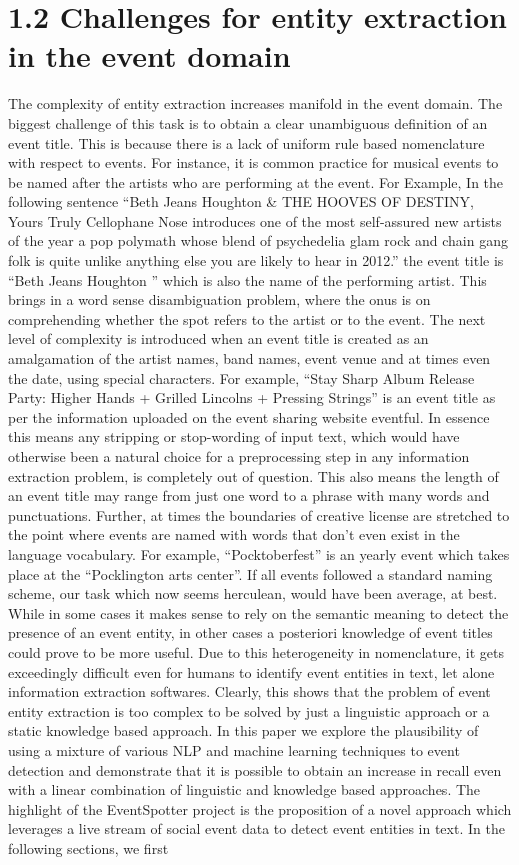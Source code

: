 \documentclass[a4paper,11pt]{report}
\begin{document}
\section*{1.2 Challenges for entity extraction in the event domain}

The complexity of entity extraction increases manifold in the event domain. The biggest challenge of this task is to obtain a clear unambiguous definition of an event title. This is because there is a lack of uniform rule based nomenclature with respect to events. For instance, it is common practice for musical events to be named after the artists who are performing at the event.  For Example, In the following sentence  ``Beth Jeans Houghton & THE HOOVES OF DESTINY,  Yours Truly Cellophane Nose introduces one of the most self-assured new artists of the year a pop polymath whose blend of psychedelia glam rock and chain gang folk is quite unlike anything else you are likely to hear in 2012.'' the event title is ``Beth Jeans Houghton '' which is also the name of the performing artist. This brings in a word sense disambiguation problem, where the onus is on comprehending whether the spot refers to the artist or to the event. The next level of complexity is introduced when an event title is created as an amalgamation of the artist names, band names, event venue and at times even the date, using special characters. For example, ``Stay Sharp Album Release Party: Higher Hands + Grilled Lincolns + Pressing Strings'' is an event title as per the information uploaded on the event sharing website eventful.  In essence this means any stripping or stop-wording of input text, which would have otherwise been a natural choice for a preprocessing step in any information extraction problem, is completely out of question. This also means the length of an event title may range from just one word to a phrase with many words and punctuations. Further, at times the boundaries of creative license are stretched to the point where events are named with words that don’t even exist in the language vocabulary. For example, ``Pocktoberfest'' is an yearly event which takes place at the ``Pocklington arts center''. If all events followed a standard naming scheme, our task which now seems herculean, would have been average, at best. While in some cases it makes sense to rely on the semantic meaning to detect the presence of an event entity, in other cases a posteriori knowledge of event titles could prove to be more useful.  Due to this heterogeneity in nomenclature, it gets exceedingly difficult even for humans to identify event entities in text, let alone information extraction softwares.  Clearly, this shows that the problem of event entity extraction is too complex to be solved by just a linguistic approach or a static knowledge based approach. In this paper we explore the plausibility of using a mixture of various NLP and machine learning techniques to event detection and demonstrate that it is possible to obtain an increase in recall even with a linear combination of linguistic and knowledge based approaches. The highlight of the EventSpotter project is the proposition of a novel approach which leverages a live stream of social event data to detect event entities in text. In the following sections, we first 
\end{document}
